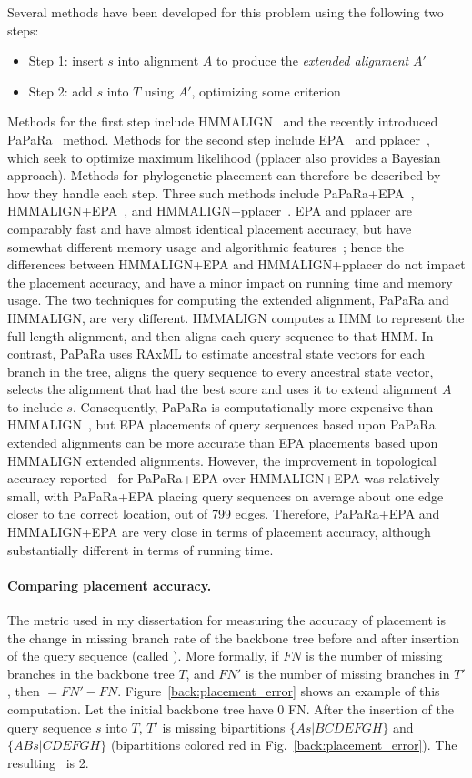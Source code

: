 Several methods have been developed for this problem using
the following two steps:
\begin{itemize}
\item Step 1: insert $s$ into alignment $A$ to produce the
{\em extended alignment} $A'$
\item Step 2: add $s$ into $T$ using $A'$, optimizing some criterion
\end{itemize}
Methods for the first step 
include HMMALIGN~\cite{Eddy1998}
and the recently introduced PaPaRa~\cite{Berger2011a} method.  
Methods for the second step include 
 EPA~\cite{Berger2011} and pplacer~\cite{Matsen2010}, which
seek to optimize maximum likelihood
(pplacer also provides a Bayesian approach).
Methods for phylogenetic placement can therefore
be described
by how they handle each step.
Three such methods
include PaPaRa+EPA~\cite{Berger2011a},
HMMALIGN+EPA~\cite{Berger2011},
and HMMALIGN+pplacer~\cite{Matsen2010}.
EPA and pplacer are comparably 
fast and have almost identical 
placement accuracy,
  but have somewhat
different memory usage and algorithmic features~\cite{Matsen2010};
hence the differences between HMMALIGN+EPA and HMMALIGN+pplacer
do not impact the placement accuracy, and have a minor
impact on running time and memory usage.
The two techniques for computing the extended alignment,
PaPaRa and HMMALIGN, are very different.
HMMALIGN computes a HMM to represent the full-length alignment,
and then aligns each query sequence to that HMM.  In contrast,
PaPaRa uses RAxML to estimate ancestral state 
vectors for each branch in the
tree, aligns the query sequence to every ancestral state
vector, selects the alignment that had the best score and uses
it to extend
alignment $A$ to include $s$.
Consequently, PaPaRa is computationally more 
expensive than HMMALIGN~\cite{Berger2011a}, but EPA placements
of query sequences based upon PaPaRa extended alignments can be
more accurate than EPA placements based upon HMMALIGN extended alignments.
However, the improvement in topological accuracy reported~\cite{Berger2011a}  for
PaPaRa+EPA over HMMALIGN+EPA was
relatively small, with PaPaRa+EPA placing
query sequences on average
about one edge closer to the correct
location, out of 799 edges. 
Therefore, PaPaRa+EPA and HMMALIGN+EPA are very close
in terms of placement accuracy, although substantially different
in terms of running time.  

\paragraph{Comparing placement accuracy.}  
The metric used in my dissertation for measuring the accuracy of placement is the change in missing branch rate of the backbone tree before and after insertion of the query sequence (called \deltafn ).  More formally, if $FN$ is the number of missing branches in the backbone tree $T$, and $FN'$ is the number of missing branches in $T'$, then \deltafn$=FN'-FN$.  Figure~\ref{back:placement_error} shows an example of this computation.  Let the initial backbone tree have 0 FN.  After the insertion of the query sequence $s$ into $T$, $T'$ is missing bipartitions $\{As|BCDEFGH\}$ and $\{ABs|CDEFGH\}$ (bipartitions colored red in Fig.~\ref{back:placement_error}).  The resulting \deltafn~is 2.

